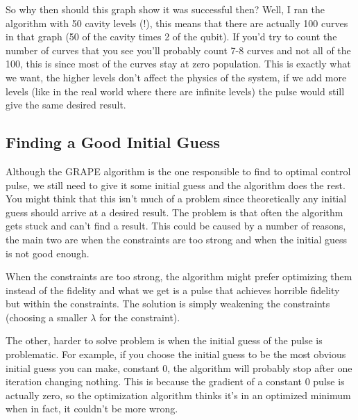 So why then should this graph show it was successful then? Well, I ran the algorithm with 50 cavity levels (!), this means that there are actually 100 curves in that graph (50 of the cavity times 2 of the qubit). If you'd try to count the number of curves that you see you'll probably count 7-8 curves and not all of the 100, this is since most of the curves stay at zero population. This is exactly what we want, the higher levels don't affect the physics of the system, if we add more levels (like in the real world where there are infinite levels) the pulse would still give the same desired result.


\subsection{Finding a Good Initial Guess}
Although the GRAPE algorithm is the one responsible to find to optimal control pulse, we still need to give it some initial guess and the algorithm does the rest. You might think that this isn't much of a problem since theoretically any initial guess should arrive at a desired result. The problem is that often the algorithm gets stuck and can't find a result. This could be caused by a number of reasons, the main two are when the constraints are too strong and when the initial guess is not good enough.

When the constraints are too strong, the algorithm might prefer optimizing them instead of the fidelity and what we get is a pulse that achieves horrible fidelity but within the constraints. The solution is simply weakening the constraints (choosing a smaller $\lambda$ for the constraint).

The other, harder to solve problem is when the initial guess of the pulse is problematic. For example, if you choose the initial guess to be the most obvious initial guess you can make, constant 0, the algorithm will probably stop after one iteration changing nothing. This is because the gradient of a constant 0 pulse is actually zero, so the optimization algorithm thinks it's in an optimized minimum when in fact, it couldn't be more wrong.

